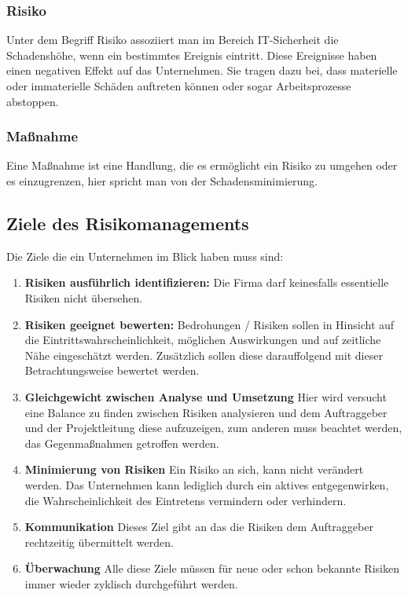 \subsubsection{Risiko}
Unter dem Begriff Risiko assoziiert man im Bereich IT-Sicherheit die Schadenshöhe, wenn ein bestimmtes Ereignis eintritt. Diese Ereignisse haben einen negativen Effekt auf das Unternehmen. Sie tragen dazu bei, dass materielle oder immaterielle Schäden auftreten können oder sogar Arbeitsprozesse abstoppen.
\\

\subsubsection{Maßnahme}
Eine Maßnahme ist eine Handlung, die es ermöglicht ein Risiko zu umgehen oder es einzugrenzen, hier spricht man von der Schadensminimierung. 

\subsection{Ziele des Risikomanagements}
Die Ziele die ein Unternehmen im Blick haben muss sind:
\begin{enumerate}
	\item \textbf{Risiken ausführlich identifizieren:} Die Firma darf keinesfalls essentielle Risiken nicht übersehen.
	\item \textbf{Risiken geeignet bewerten:} Bedrohungen / Risiken sollen in Hinsicht auf die Eintrittswahrscheinlichkeit, möglichen Auswirkungen und auf zeitliche Nähe eingeschätzt werden. Zusätzlich sollen diese darauffolgend mit dieser Betrachtungsweise bewertet werden.
	\item \textbf{Gleichgewicht zwischen Analyse und Umsetzung} Hier wird versucht eine Balance zu finden zwischen Risiken analysieren und dem Auftraggeber und der Projektleitung diese aufzuzeigen, zum anderen muss beachtet werden, das Gegenmaßnahmen getroffen werden.
	\item \textbf{Minimierung von Risiken} Ein Risiko an sich, kann nicht verändert werden. Das Unternehmen kann lediglich durch ein aktives entgegenwirken, die Wahrscheinlichkeit des Eintretens vermindern oder verhindern.
	\item \textbf{Kommunikation} Dieses Ziel gibt an das die Risiken dem Auftraggeber rechtzeitig übermittelt werden.
	\item \textbf{Überwachung} Alle diese Ziele müssen für neue oder schon bekannte Risiken immer wieder zyklisch durchgeführt werden. 
\end{enumerate}

